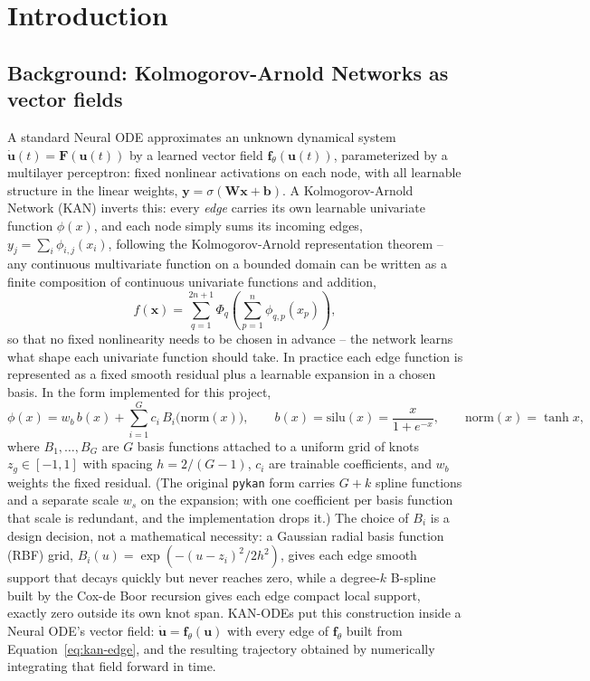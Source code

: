\section{Introduction}
\label{sec:introduction}

\subsection{Background: Kolmogorov-Arnold Networks as vector fields}

A standard Neural ODE \cite{chen2018neuralode} approximates an unknown
dynamical system $\dot{\mathbf{u}}(t) = \mathbf{F}(\mathbf{u}(t))$ by a
learned vector field $\mathbf{f}_\theta(\mathbf{u}(t))$, parameterized by a
multilayer perceptron: fixed nonlinear activations on each node, with all
learnable structure in the linear weights,
$\mathbf{y} = \sigma(\mathbf{W}\mathbf{x}+\mathbf{b})$. A Kolmogorov-Arnold
Network (KAN) \cite{liu2024kan} inverts this: every \emph{edge} carries its
own learnable univariate function $\phi(x)$, and each node simply sums its
incoming edges, $y_j = \sum_i \phi_{i,j}(x_i)$, following the
Kolmogorov-Arnold representation theorem -- any continuous multivariate
function on a bounded domain can be written as a finite composition of
continuous univariate functions and addition,
\begin{equation}
f(\mathbf{x}) = \sum_{q=1}^{2n+1}\Phi_q\!\left(\sum_{p=1}^{n}\phi_{q,p}(x_p)\right),
\label{eq:kolmogorov-arnold}
\end{equation}
so that no fixed nonlinearity needs to be chosen in advance -- the network
learns what shape each univariate function should take. In practice each
edge function is represented as a fixed smooth residual plus a learnable
expansion in a chosen basis. In the form implemented for this project,
\begin{equation}
\phi(x) = w_b\, b(x) + \sum_{i=1}^{G} c_i\, B_i\big(\mathrm{norm}(x)\big), \qquad
b(x)=\mathrm{silu}(x) = \frac{x}{1+e^{-x}}, \qquad \mathrm{norm}(x)=\tanh x,
\label{eq:kan-edge}
\end{equation}
where $B_1,\dots,B_G$ are $G$ basis functions attached to a uniform grid of
knots $z_g\in[-1,1]$ with spacing $h=2/(G-1)$, $c_i$ are trainable
coefficients, and $w_b$ weights the fixed residual. (The original
\texttt{pykan} form carries $G+k$ spline functions and a separate scale $w_s$
on the expansion; with one coefficient per basis function that scale is
redundant, and the implementation drops it.) The choice of $B_i$ is a design
decision, not a mathematical necessity: a Gaussian radial basis function
(RBF) grid, $B_i(u)=\exp(-(u-z_i)^2/2h^2)$, gives each edge smooth support
that decays quickly but never reaches zero, while a degree-$k$ B-spline built
by the Cox-de Boor recursion gives each edge compact local support, exactly
zero outside its own knot span. KAN-ODEs \cite{Koenig_2024} put this
construction inside a Neural ODE's vector field:
$\dot{\mathbf{u}}=\mathbf{f}_\theta(\mathbf{u})$ with every edge of
$\mathbf{f}_\theta$ built from Equation~\ref{eq:kan-edge}, and the resulting
trajectory obtained by numerically integrating that field forward in time.

